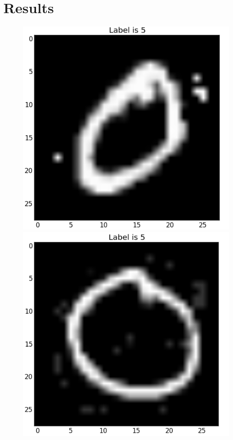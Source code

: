 \documentclass{beamer}
\begin{document}
\section{Results}
\begin{frame}
  \begin{figure}
    \centering
    \includegraphics[width=0.48\columnwidth]{0-free.png}
    \includegraphics[width=0.48\columnwidth]{0-limited.png}
  \end{figure}
\end{frame}
\end{document}
